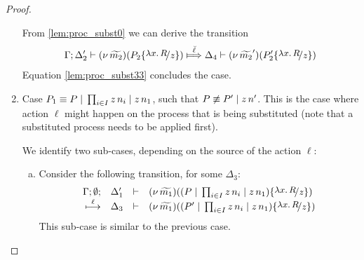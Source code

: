 \begin{proof}
\begin{enumerate}
				From \eqref{lem:proc_subst0} we can derive the transition
				\begin{eqnarray*}
					\horel{\Gamma}{\Delta_2'}{\newsp{\widetilde{m_2}}{P_2 \subst{{\abs{x}{R}}}{z} }}
					{\Hby{\mact{\ell}}}
					{\Delta_4}{\newsp{\widetilde{m_2}'}{P_2' \subst{{\abs{x}{R}}}{z} }}
				\end{eqnarray*}
				Equation \eqref{lem:proc_subst33} concludes the case.


		\item	Case $P_1 \equiv P \;|\; \prod_{i \in I} z\, {n_i} \;|\; z\, {n_1}$, such that
				$P \not\equiv P' \;|\; z\, {n'}$. This is the case where action $\ell$ might
				happen on the process that is being substituted (note that a substituted process
				needs to be applied first).

				We identify two sub-cases, depending on the source of the action $\ell$:
				\begin{enumerate}[(a)]
					\item	Consider the following transition, for some $\Delta_3$:
							\begin{eqnarray*}
								\mhorel{\Gamma}{\Delta_1'}{\newsp{\widetilde{m_1}}{(P \Par \prod_{i \in I} \appl{z}{n_i} \Par \appl{z}{n_1}) \subst{{\abs{x}{R}}}{z} }}
								{\hby{\ell}}
								{\Delta_3}{}{\newsp{\widetilde{m_1}}{(P' \Par \prod_{i \in I} \appl{z}{n_i} \Par \appl{z}{n_1}) \subst{{\abs{x}{R}}}{z} }}
							\end{eqnarray*}
							This sub-case is similar to the previous case.


\end{enumerate}
\end{enumerate}
\end{proof}
